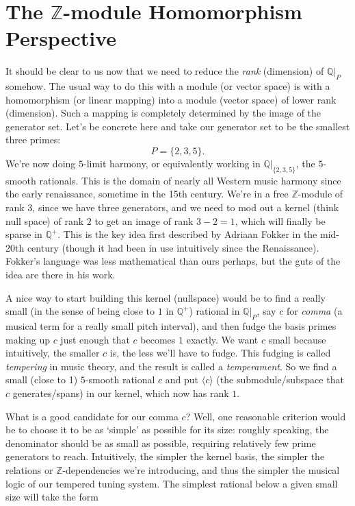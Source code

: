 \documentclass[12pt]{article}
\newcommand{\ZZ}{\mathbb{Z}}      %
\newcommand{\QQ}{\mathbb{Q}}      %
\begin{document}
\section{The $\ZZ$-module Homomorphism Perspective}
\par
It should be clear to us now that we need to reduce the \emph{rank} (dimension) of $\QQ |_P$ somehow.  The usual way to do this with a module (or vector space) is with a homomorphism (or linear mapping) into a module (vector space) of lower rank (dimension).  Such a mapping is completely determined by the image of the generator set.  Let's be concrete here and take our generator set to be the smallest three primes:
\[P=\{2,3,5\}\text{.}\]
We're now doing $5$-limit harmony, or equivalently working in $\QQ |_{\{2,3,5\}}$, the $5$-smooth rationals.  This is the domain of nearly all Western music harmony since the early renaissance, sometime in the 15th century.  We're in a free $\ZZ$-module of rank $3$, since we have three generators, and we need to mod out a kernel (think null space) of rank $2$ to get an image of rank $3-2=1$, which will finally be sparse in $\QQ^+$.  This is the key idea first described by Adriaan Fokker in the mid-20th century (though it had been in use intuitively since the Renaissance).  Fokker's language was less mathematical than ours perhaps,  but the guts of the idea are there in his work.\\
\par
A nice way to start building this kernel (nullspace) would be to find a really small (in the sense of being close to $1$ in $\QQ^+$) rational in $\QQ |_P$, say $c$ for \emph{comma} (a musical term for a really small pitch interval), and then fudge the basis primes making up $c$ just enough that $c$ becomes $1$ exactly.  We want $c$ small because intuitively, the smaller $c$ is, the less we'll have to fudge.  This fudging is called \emph{tempering} in music theory, and the result is called a \emph{temperament}.  So we find a small (close to 1) $5$-smooth rational $c$ and put $\langle c\rangle$ (the submodule/subspace that $c$ generates/spans) in our kernel, which now has rank $1$.\\
\par
What is a good candidate for our comma $c$?  Well, one reasonable criterion would be to choose it to be as `simple' as possible for its size: roughly speaking, the denominator should be as small as possible, requiring relatively few prime generators to reach.  Intuitively, the simpler the kernel basis, the simpler the relations or $\ZZ$-dependencies we're introducing, and thus the simpler the musical logic of our tempered tuning system.  The simplest rational below a given small size will take the form
\end{document}
